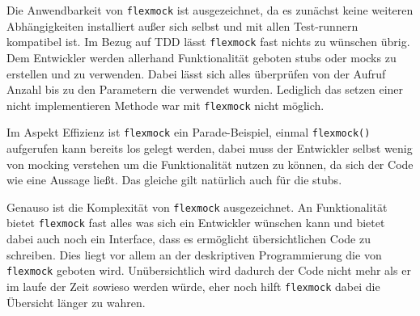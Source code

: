 Die Anwendbarkeit von \lstinline{flexmock} ist ausgezeichnet, da es zunächst
keine weiteren Abhängigkeiten installiert außer sich selbst und mit allen
Test-runnern kompatibel ist. Im Bezug auf TDD lässt \lstinline{flexmock} fast
nichts zu wünschen übrig. Dem Entwickler werden allerhand Funktionalität geboten
\Glspl{stub} oder \Glspl{mock} zu erstellen und zu verwenden. Dabei lässt sich
alles überprüfen von der Aufruf Anzahl bis zu den Parametern die verwendet
wurden. Lediglich das setzen einer nicht implementieren Methode war mit
\lstinline{flexmock} nicht möglich.

Im Aspekt Effizienz ist \lstinline{flexmock} ein Parade-Beispiel, einmal
\lstinline{flexmock()} aufgerufen kann bereits los gelegt werden, dabei muss der
Entwickler selbst wenig von \gls{mock}ing verstehen um die Funktionalität nutzen
zu können, da sich der Code wie eine Aussage ließt. Das gleiche gilt natürlich
auch für die \Glspl{stub}.

Genauso ist die Komplexität von \lstinline{flexmock} ausgezeichnet. An
Funktionalität bietet \lstinline{flexmock} fast alles was sich ein Entwickler
wünschen kann und bietet dabei auch noch ein Interface, dass es ermöglicht
übersichtlichen Code zu schreiben. Dies liegt vor allem an der deskriptiven
Programmierung die von \lstinline{flexmock} geboten wird. Unübersichtlich
wird dadurch der Code nicht mehr als er im laufe der Zeit sowieso werden würde,
eher noch hilft \lstinline{flexmock} dabei die Übersicht länger zu wahren.